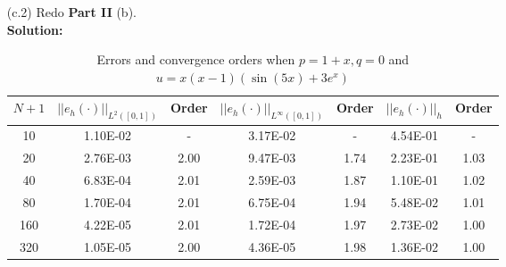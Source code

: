 \documentclass[11pt]{article}      %
\begin{document}
\begin{enumerate}
\begin{enumerate}
\begin{itemize}
\item[(c.2)] Redo {\bf Part II} (b). \\
{\bf Solution: }
\begin{table}[!h]
\caption{Errors and convergence orders when $p=1+x, q=0$ and $u=x(x-1)(\sin(5x)+3e^x)$}
\vspace{0.1in}
\centering
\begin{tabular}{|c|c|c| c| c| c| c|}
	\hline
	$N+1$&  $||e_h(\cdot)||_{L^2([0,1])}$ & Order  & $||e_h(\cdot)||_{L^\infty([0,1])}$ & Order& $||e_h(\cdot)||_h$& Order \\
	\hline
	10 & 1.10E-02 & - & 3.17E-02 & - & 4.54E-01 &- \\
	20 & 2.76E-03 & 2.00&9.47E-03   & 1.74   & 2.23E-01 &1.03\\
	40 & 6.83E-04  & 2.01 & 2.59E-03   & 1.87 & 1.10E-01 &1.02\\
	80 & 1.70E-04  & 2.01 & 6.75E-04   & 1.94 & 5.48E-02 &1.01\\
	160 & 4.22E-05   & 2.01 & 1.72E-04   &1.97  & 2.73E-02 &1.00\\
	320 &1.05E-05   & 2.00  & 4.36E-05   & 1.98 & 1.36E-02 &1.00\\
	\hline
\end{tabular}
\label{tab2}
\end{table}
\end{itemize} 



\end{enumerate}
\end{enumerate}
\end{document}

